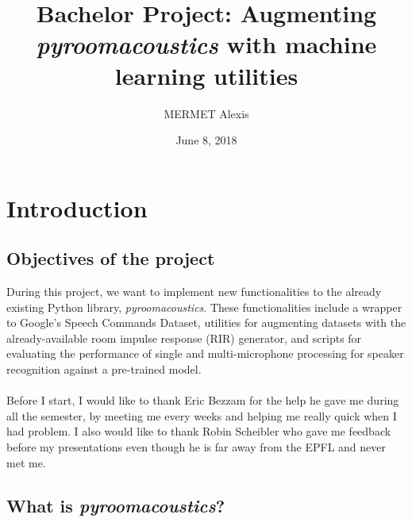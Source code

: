 \documentclass[11pt,a4paper,titlepage]{report}
\author{MERMET Alexis}
\title{Bachelor Project: Augmenting \textit{pyroomacoustics} with machine learning utilities}
\date{June 8, 2018}
\begin{document}
\maketitle
\tableofcontents
\newpage
\chapter{Introduction}
\section{Objectives of the project}
\hspace*{0.6cm}
During this project, we want to implement new functionalities to the already existing Python library, \textit{pyroomacoustics}. These functionalities include a wrapper to Google's Speech Commands Dataset, utilities for augmenting  datasets with the already-available room impulse response (RIR) generator, and scripts for evaluating the performance of single and multi-microphone processing for speaker recognition against a pre-trained model.\\
\\
\hspace*{0.6cm}
Before I start, I would like to thank Eric Bezzam for the help he gave me during all the semester, by meeting me every weeks and helping me really quick when I had problem.
I also would like to thank Robin Scheibler who gave me feedback before my presentations even though he is far away from the EPFL and never met me.


\section{What is \textit{pyroomacoustics}?}
\end{document}
